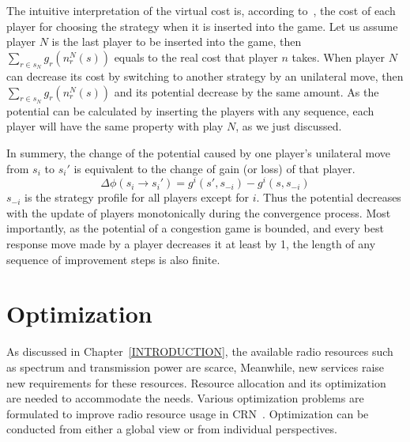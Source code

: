 The intuitive interpretation of the virtual cost is, according to~\cite{Voecking06congestiongames}, the cost of each player for choosing the strategy when it is inserted into the game.
Let us assume player $N$ is the last player to be inserted into the game, then $\sum\limits^{}_{r\in s_N} g_r(n_r^N(s))$ equals to the real cost that player $n$ takes.
When player $N$ can decrease its cost by switching to another strategy by an unilateral move, then $\sum\limits^{}_{r\in s_N} g_r(n_r^N(s))$ and its potential decrease by the same amount.
As the potential can be calculated by inserting the players with any sequence, each player will have the same property with play $N$, as we just discussed.

In summery, the change of the potential caused by one player's unilateral move from $s_i$ to $s_i'$ is equivalent to the change of gain (or loss) of that player.
\begin{equation}
\label{5}
\varDelta \phi(s_i \rightarrow s_i') = g^i(s',s_{-i}) - g^i(s,s_{-i})
\end{equation}
$s_{-i}$ is the strategy profile for all players except for $i$.
Thus the potential decreases with the update of players monotonically during the convergence process.
Most importantly, as the potential of a congestion game is bounded, and every best response move made by a player decreases it at least by 1, the length of any sequence of improvement steps is also finite.







\section{Optimization}
As discussed in Chapter~\ref{INTRODUCTION}, the available radio resources such as spectrum and transmission power are scarce, Meanwhile, new services raise new requirements for these resources.
Resource allocation and its optimization are needed to accommodate the needs.
Various optimization problems are formulated to improve radio resource usage in CRN~\cite{cacao_ca_2011, fuzzy_decision_09, resourceAllocation_imperfectSensing_2012}.
Optimization can be conducted from either a global view or from individual perspectives.


